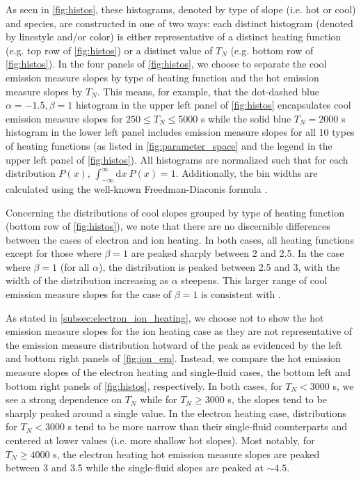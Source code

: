 \documentclass[apj]{emulateapj}
\begin{document}
	\par As seen in \autoref{fig:histos}, these histograms, denoted by type of slope (i.e. hot or cool) and species, are constructed in one of two ways: each distinct histogram (denoted by linestyle and/or color) is either representative of a distinct heating function (e.g. top row of \autoref{fig:histos}) or a distinct value of $T_N$ (e.g. bottom row of \autoref{fig:histos}). In the four panels of \autoref{fig:histos}, we choose to separate the cool emission measure slopes by type of heating function and the hot emission measure slopes by $T_N$. This means, for example, that the dot-dashed blue $\alpha=-1.5,\beta=1$ histogram in the upper left panel of \autoref{fig:histos} encapsulates cool emission measure slopes for $250\le T_N\le5000$ s while the solid blue $T_N=2000$ s histogram in the lower left panel includes emission measure slopes for all 10 types of heating functions (as listed in \autoref{fig:parameter_space} and the legend in the upper left panel of \autoref{fig:histos}). All histograms are normalized such that for each distribution $P(x)$, $\int_{-\infty}^{\infty}\mathrm{d}x~P(x)=1$. Additionally, the bin widths are calculated using the well-known Freedman-Diaconis formula \citep{freedman_histogram_1981}.
	\par Concerning the distributions of cool slopes grouped by type of heating function (bottom row of \autoref{fig:histos}), we note that there are no discernible differences between the cases of electron and ion heating. In both cases, all heating functions except for those where $\beta=1$ are peaked sharply between 2 and 2.5. In the case where $\beta=1$ (for all $\alpha$), the distribution is peaked between 2.5 and 3, with the width of the distribution increasing as $\alpha$ steepens. This larger range of cool emission measure slopes for the case of $\beta=1$ is consistent with \citet{cargill_active_2014}.
	\par As stated in \autoref{subsec:electron_ion_heating}, we choose not to show the hot emission measure slopes for the ion heating case as they are not representative of the emission measure distribution hotward of the peak as evidenced by the left and bottom right panels of \autoref{fig:ion_em}. Instead, we compare the hot emission measure slopes of the electron heating and single-fluid cases, the bottom left and bottom right panels of \autoref{fig:histos}, respectively. In both cases, for $T_N<3000$ s, we see a strong dependence on $T_N$ while for $T_N\ge3000$ s, the slopes tend to be sharply peaked around a single value. In the electron heating case, distributions for $T_N<3000$ s tend to be more narrow than their single-fluid counterparts and centered at lower values (i.e. more shallow hot slopes). Most notably, for $T_N\ge4000$ s, the electron heating hot emission measure slopes are peaked between 3 and 3.5 while the single-fluid slopes are peaked at $\sim4.5$. 
\end{document}
